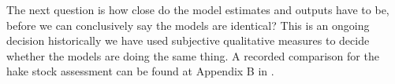 The next question is how close do the model estimates and outputs have to be, before we can conclusively say the models are identical? This is an ongoing decision historically we have used subjective qualitative measures to decide whether the models are doing the same thing. A recorded comparison for the hake stock assessment can be found at Appendix B in \cite{horn2017stock}.








